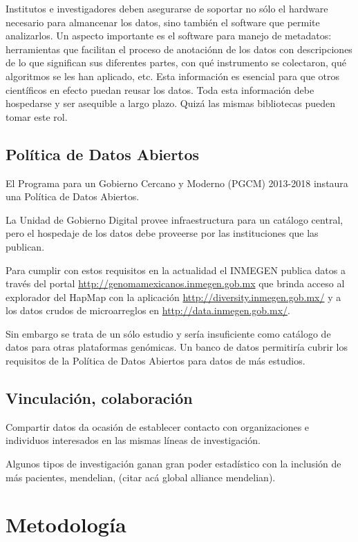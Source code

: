 \documentclass[
10pt, %
letterpaper, %
oneside, %
headinclude,footinclude, %
BCOR5mm, %
]{scrartcl}
\begin{document}
Institutos e investigadores deben asegurarse de soportar no sólo el
hardware necesario para almancenar los datos, sino también el software
que permite analizarlos. Un aspecto importante es el software para
manejo de metadatos: herramientas que facilitan el proceso de
anotaciónn de los datos con descripciones de lo que significan sus
diferentes partes, con qué instrumento se colectaron, qué algoritmos
se les han aplicado, etc. Esta información es esencial para que otros
científicos en efecto puedan reusar los datos. Toda esta información
debe hospedarse y ser asequible a largo plazo. Quizá las mismas
bibliotecas pueden tomar este rol.\cite{said_datas_2009}


\subsection{Política de Datos Abiertos}
El Programa para un Gobierno Cercano y Moderno (PGCM) 2013-2018
instaura una Política de Datos Abiertos.

La Unidad de Gobierno Digital provee infraestructura para un catálogo
central, pero el hospedaje de los datos debe proveerse por las
instituciones que las publican.

Para cumplir con estos requisitos en la actualidad el INMEGEN publica
datos a través del portal \url{http://genomamexicanos.inmegen.gob.mx} que
brinda acceso al explorador del HapMap con la aplicación
\url{http://diversity.inmegen.gob.mx/} y a los datos crudos de microarreglos
en \url{http://data.inmegen.gob.mx/}.

Sin embargo se trata de un sólo estudio y sería insuficiente como
catálogo de datos para otras plataformas genómicas. Un banco de datos
permitiría cubrir los requisitos de la Política de Datos Abiertos para
datos de más estudios.


\subsection{Vinculación, colaboración}
Compartir datos da ocasión de establecer contacto con organizaciones e
individuos interesados en las mismas líneas de investigación.

Algunos tipos de investigación ganan gran poder estadístico con la
inclusión de más pacientes, mendelian, (citar acá global alliance
mendelian). 


\section{Metodología}
\end{document}
